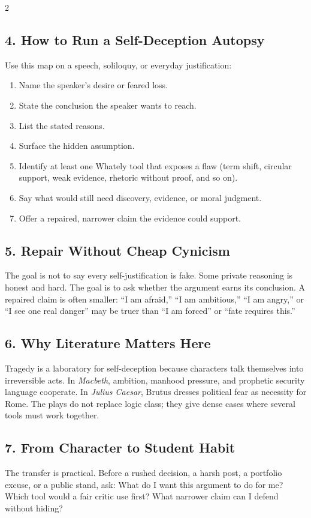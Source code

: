 \documentclass[12pt]{article}
\begin{document}
\begin{multicols}{2}
\subsection*{4. How to Run a Self-Deception Autopsy}
Use this map on a speech, soliloquy, or everyday justification:

\begin{enumerate}[leftmargin=*,itemsep=0.12em]
\item Name the speaker's desire or feared loss.
\item State the conclusion the speaker wants to reach.
\item List the stated reasons.
\item Surface the hidden assumption.
\item Identify at least one Whately tool that exposes a flaw (term shift, circular support, weak evidence, rhetoric without proof, and so on).
\item Say what would still need discovery, evidence, or moral judgment.
\item Offer a repaired, narrower claim the evidence could support.
\end{enumerate}

\subsection*{5. Repair Without Cheap Cynicism}
The goal is not to say every self-justification is fake. Some private reasoning is honest and hard. The goal is to ask whether the argument earns its conclusion. A repaired claim is often smaller: ``I am afraid,'' ``I am ambitious,'' ``I am angry,'' or ``I see one real danger'' may be truer than ``I am forced'' or ``fate requires this.''

\subsection*{6. Why Literature Matters Here}
Tragedy is a laboratory for self-deception because characters talk themselves into irreversible acts. In \textit{Macbeth}, ambition, manhood pressure, and prophetic security language cooperate. In \textit{Julius Caesar}, Brutus dresses political fear as necessity for Rome. The plays do not replace logic class; they give dense cases where several tools must work together.

\subsection*{7. From Character to Student Habit}
The transfer is practical. Before a rushed decision, a harsh post, a portfolio excuse, or a public stand, ask: What do I want this argument to do for me? Which tool would a fair critic use first? What narrower claim can I defend without hiding?


\end{multicols}
\end{document}
